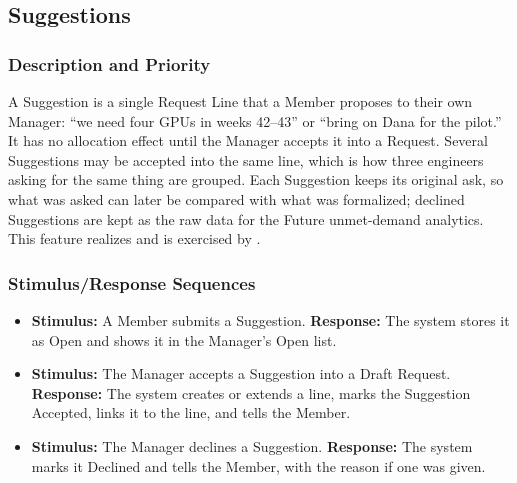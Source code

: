 \subsection{Suggestions}\label{feat:suggestions}

\subsubsection{Description and Priority}
A Suggestion is a single Request Line that a Member proposes to their own Manager: ``we need four GPUs in weeks 42--43'' or ``bring on Dana for the pilot.'' It has no allocation effect until the Manager accepts it into a Request. Several Suggestions may be accepted into the same line, which is how three engineers asking for the same thing are grouped. Each Suggestion keeps its original ask, so what was asked can later be compared with what was formalized; declined Suggestions are kept as the raw data for the Future unmet-demand analytics. This feature realizes  and is exercised by . 

\subsubsection{Stimulus/Response Sequences}
\begin{itemize}
  \item \textbf{Stimulus:} A Member submits a Suggestion. \textbf{Response:} The system stores it as Open and shows it in the Manager's Open list.
  \item \textbf{Stimulus:} The Manager accepts a Suggestion into a Draft Request. \textbf{Response:} The system creates or extends a line, marks the Suggestion Accepted, links it to the line, and tells the Member.
  \item \textbf{Stimulus:} The Manager declines a Suggestion. \textbf{Response:} The system marks it Declined and tells the Member, with the reason if one was given.
\end{itemize}

